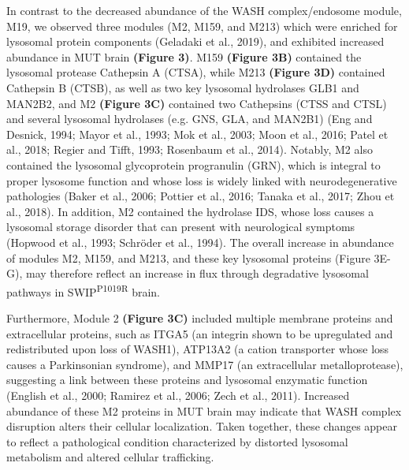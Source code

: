 In contrast to the decreased abundance of the WASH complex/endosome module, M19,
we observed three modules (M2, M159, and M213) which were enriched for lysosomal
protein components (Geladaki et al., 2019), and exhibited increased abundance in
MUT brain \textbf{(Figure 3)}. M159 \textbf{(Figure 3B)} contained the lysosomal protease
Cathepsin A (CTSA), while M213 \textbf{(Figure 3D)} contained Cathepsin B (CTSB), as well
as two key lysosomal hydrolases GLB1 and MAN2B2, and M2 \textbf{(Figure 3C)} contained
two Cathepsins (CTSS and CTSL) and several lysosomal hydrolases (e.g. GNS, GLA,
and MAN2B1) (Eng and Desnick, 1994; Mayor et al., 1993; Mok et al., 2003; Moon
et al., 2016; Patel et al., 2018; Regier and Tifft, 1993; Rosenbaum et al.,
2014). Notably, M2 also contained the lysosomal glycoprotein progranulin (GRN),
which is integral to proper lysosome function and whose loss is widely linked
with neurodegenerative pathologies (Baker et al., 2006; Pottier et al., 2016;
Tanaka et al., 2017; Zhou et al., 2018). In addition, M2 contained the hydrolase
IDS, whose loss causes a lysosomal storage disorder that can present with
neurological symptoms (Hopwood et al., 1993; Schröder et al., 1994). The overall
increase in abundance of modules M2, M159, and M213, and these key lysosomal
proteins (Figure 3E-G), may therefore reflect an increase in flux through
degradative lysosomal pathways in SWIP\textsuperscript{P1019R} brain. 

Furthermore, Module 2 \textbf{(Figure 3C)} included multiple membrane proteins and
extracellular proteins, such as ITGA5 (an integrin shown to be upregulated and
redistributed upon loss of WASH1), ATP13A2 (a cation transporter whose loss
causes a Parkinsonian syndrome), and MMP17 (an extracellular metalloprotease),
suggesting a link between these proteins and lysosomal enzymatic function
(English et al., 2000; Ramirez et al., 2006; Zech et al., 2011). Increased
abundance of these M2 proteins in MUT brain may indicate that WASH complex
disruption alters their cellular localization. Taken together, these changes
appear to reflect a pathological condition characterized by distorted lysosomal
metabolism and altered cellular trafficking.

